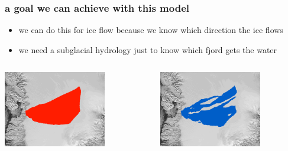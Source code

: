 \documentclass[hide notes,intlimits]{beamer}
\begin{document}
\begin{frame}
  \frametitle{a goal we can achieve with this model}
 
\begin{center}
\end{center}
  
  \begin{itemize}
    \item we can do this for ice flow because we know which direction the ice flows
    \item we need a subglacial hydrology just to know which fjord gets the water
  \end{itemize}

\begin{columns}
\begin{column}{0.5\textwidth}
\begin{center}
\includegraphics[width=0.7\textwidth]{figs/ftt-mask}
\end{center}
\end{column}
\begin{column}{0.5\textwidth}
\begin{center}
\includegraphics[width=0.7\textwidth]{figs/hydro-mask}
\end{center}
\end{column}
\end{columns}

\end{frame}
\end{document}
